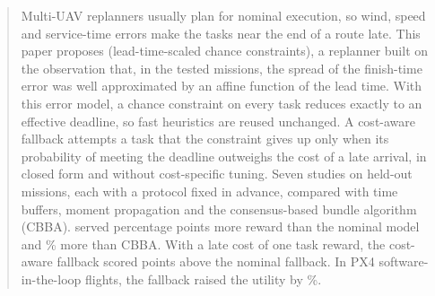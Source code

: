 \begin{abstract}
Multi-UAV replanners usually plan for nominal execution, so wind, speed and service-time errors make the tasks near the
end of a route late. This paper proposes \mname{} (lead-time-scaled chance constraints), a
replanner built on the observation that, in the tested missions, the
spread of the finish-time error was well approximated by an affine function of the lead time. With this error model, a
chance constraint on every task reduces exactly to an effective deadline, so fast heuristics are reused unchanged. A cost-aware fallback attempts a task that the constraint gives up only when its probability of meeting the
deadline outweighs the cost of a late arrival, in closed form and without cost-specific tuning. Seven studies on
held-out missions, each with a protocol fixed in advance, compared \mname{} with time buffers, moment propagation and
the consensus-based bundle algorithm (CBBA). \mname{} served  percentage points more reward than the
nominal model and \% more than CBBA. With a late cost of one task reward, the cost-aware fallback
scored  points above the nominal fallback. In PX4 software-in-the-loop flights, the fallback raised the
utility by \%.
\end{abstract}
